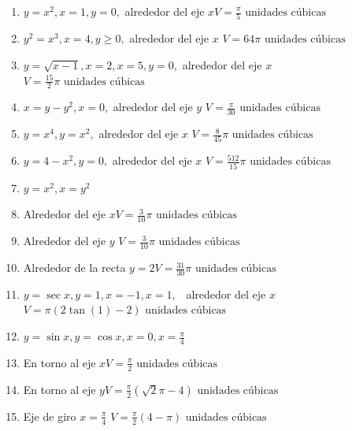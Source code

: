 {\small
\begin{enumerate}
	
\item {$y=x^{2},x=1,y=0,$ alrededor del eje $x$}{$V=\frac{\pi}{5}\text{ unidades cúbicas}$}\label{volinic}

\item {$y^{2}=x^{3},x=4,y\geq0,$ alrededor del eje $x$} {$V=64\pi \text{ unidades cúbicas}$}

\item {$y=\sqrt{x-1},x=2,x=5,y=0,$ alrededor del eje $x$} \\ {$V=\frac{15}{2}\pi \text{ unidades cúbicas}$}

\item {$x=y-y^{2},x=0,$ alrededor del eje $y$} {$V=\frac{\pi }{30}\text{ unidades cúbicas}$}

\item {$y=x^{4},y=x^{2},$ alrededor del eje $x$} {$V=\frac{8}{45}\pi \text{ unidades cúbicas}$}

\item {$y=4-x^{2},y=0,$ alrededor del eje $x$} {$V=\frac{512}{15}\pi \text{ unidades cúbicas}$}

\item {$y=x^{2},x=y^{2}$}

\item {Alrededor del eje $x$}{$V=\frac{3}{10}\pi \text{ unidades cúbicas}$}

\item {Alrededor del eje $y$} {$V=\frac{3}{10}\pi \text{ unidades cúbicas}$}

\item {Alrededor de la recta $y=2$}{$V=\frac{31}{30}\pi \text{ unidades cúbicas}$}

\item {$y=\sec x,y=1,x=-1,x=1,$ \ alrededor del eje $x$} {$V=\pi (2\tan (1)-2)\text{ unidades cúbicas}$}

\item {$y=\sin x,y=\cos x,x=0,x=\frac{\pi }{4}$}

\item {En torno al eje $x$}{$V=\frac{\pi }{2}\text{ unidades cúbicas}$}

\item {En torno al eje $y$}{$V=\frac{\pi }{2}\left( \sqrt{2}\pi -4\right)\text{ unidades cúbicas}$}

\item {Eje de giro $x=\frac{\pi }{4}$} {$V=\frac{\pi }{2}\left( 4-\pi \right)
\text{ unidades cúbicas}$}


\end{enumerate}}
